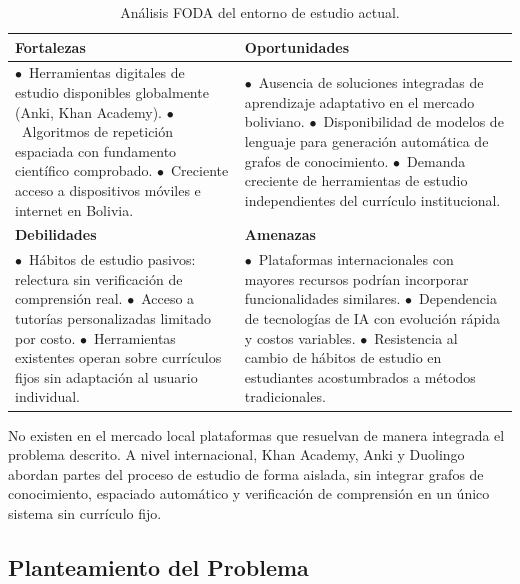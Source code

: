 \documentclass{univalle-perfil}
\begin{document}
\begin{table}[H]
\centering
\caption{Análisis FODA del entorno de estudio actual.}
{\renewcommand{\arraystretch}{1.5}
\begin{tabular}{|p{}|p{}|}
\hline
\textbf{Fortalezas} & \textbf{Oportunidades} \\
\hline
$\bullet$~Herramientas digitales de estudio disponibles globalmente (Anki, Khan Academy). \newline
$\bullet$~Algoritmos de repetición espaciada con fundamento científico comprobado. \newline
$\bullet$~Creciente acceso a dispositivos móviles e internet en Bolivia.
&
$\bullet$~Ausencia de soluciones integradas de aprendizaje adaptativo en el mercado boliviano. \newline
$\bullet$~Disponibilidad de modelos de lenguaje para generación automática de grafos de conocimiento. \newline
$\bullet$~Demanda creciente de herramientas de estudio independientes del currículo institucional.
\\
\hline
\textbf{Debilidades} & \textbf{Amenazas} \\
\hline
$\bullet$~Hábitos de estudio pasivos: relectura sin verificación de comprensión real. \newline
$\bullet$~Acceso a tutorías personalizadas limitado por costo. \newline
$\bullet$~Herramientas existentes operan sobre currículos fijos sin adaptación al usuario individual.
&
$\bullet$~Plataformas internacionales con mayores recursos podrían incorporar funcionalidades similares. \newline
$\bullet$~Dependencia de tecnologías de IA con evolución rápida y costos variables. \newline
$\bullet$~Resistencia al cambio de hábitos de estudio en estudiantes acostumbrados a métodos tradicionales.
\\
\hline
\end{tabular}}
\end{table}

No existen en el mercado local plataformas que resuelvan de manera integrada el problema descrito. A nivel internacional, Khan Academy, Anki y Duolingo abordan partes del proceso de estudio de forma aislada, sin integrar grafos de conocimiento, espaciado automático y verificación de comprensión en un único sistema sin currículo fijo.

\subsection{Planteamiento del Problema}
\end{document}
